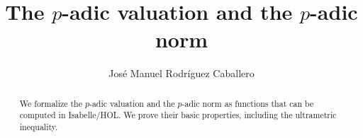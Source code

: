 \documentclass[11pt,a4paper]{article}
\begin{document}
\title{The $p$-adic valuation and the $p$-adic norm}
\author{Jos\'e Manuel Rodr\'iguez Caballero}
\maketitle

\begin{abstract}
We formalize the $p$-adic valuation and the $p$-adic norm as functions that can be computed in Isabelle/HOL. We prove their basic properties, including the ultrametric inequality.
\end{abstract}

\tableofcontents






\end{document}

